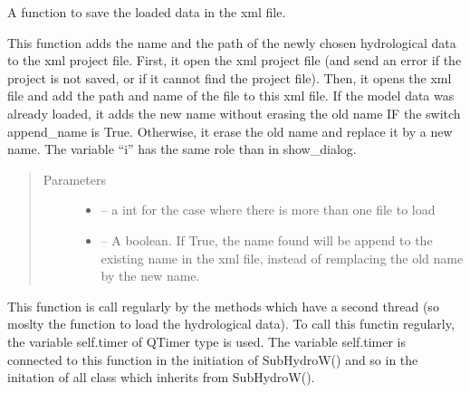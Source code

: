 \documentclass[letterpaper,10pt,english]{sphinxmanual}
\begin{document}
\begin{fulllineitems}

\begin{fulllineitems}
\label{\detokenize{index:src_GUI.hydro_GUI_2.SubHydroW.save_xml}}
A function to save the loaded data in the xml file.

This function adds the name and the path of the newly chosen hydrological data to the xml project file. First,
it open the xml project file (and send an error if the project is not saved, or if it cannot find the project
file). Then, it opens the xml file and add the path and name of the file to this xml file. If the model data was
already loaded, it adds the new name without erasing the old name IF the switch append\_name is True. Otherwise,
it erase the old name and replace it by a new name. The variable “i” has the same role than in show\_dialog.
\begin{quote}\begin{description}
\item[{Parameters}] \leavevmode\begin{itemize}
\item {} 
 -- a int for the case where there is more than one file to load

\item {} 
 -- A boolean. If True, the name found will be append to the existing name in the xml file,
instead of remplacing the old name by the new name.

\end{itemize}

\end{description}\end{quote}

\end{fulllineitems}


\begin{fulllineitems}
\label{\detokenize{index:src_GUI.hydro_GUI_2.SubHydroW.send_data}}
This function is call regularly by the methods which have a second thread (so moslty the function
to load the hydrological data). To call this functin regularly, the variable self.timer of QTimer type is used.
The variable self.timer is connected to this function in the initiation of SubHydroW() and so in the initation
of all class which inherits from SubHydroW().


\end{fulllineitems}
\end{fulllineitems}
\end{document}

